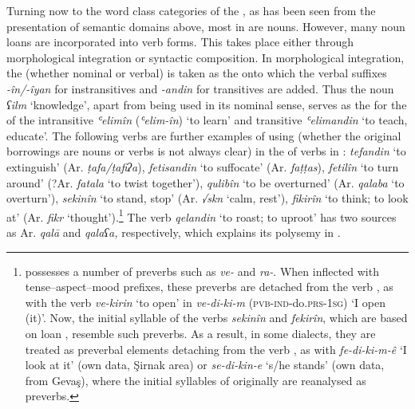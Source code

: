 \documentclass[output=paper]{langsci/langscibook}
\begin{document}
Turning now to the word class categories of the , as has been seen from the presentation of semantic domains above, most   in  are nouns. However, many  noun loans are incorporated into  verb forms. This takes place either through morphological integration or syntactic composition. In morphological integration, the   (whether nominal or verbal) is taken as the  onto which the  verbal suffixes \textit{-în/-îyan} for instransitives and \textit{{}-andin} for transitives are added. Thus the  noun \textit{ʕilm} ‘knowledge’, apart from being used in its nominal sense, serves as the  for the  of the intransitive \textit{ʿelimîn} (\textit{ʿelim-în}) ‘to learn’ and transitive \textit{ʿelimandin} ‘to teach, educate’. The following verbs are further examples of using   (whether the original borrowings are nouns or verbs is not always clear) in the  of verbs in : \textit{tefandin} ‘to extinguish’ (Ar. \textit{ṭafa/ṭafiʔa}), \textit{fetisandin} ‘to suffocate’ (Ar. \textit{faṭṭas}), \textit{fetilîn} ‘to turn around’ (?Ar. \textit{fatala} ‘to twist together’), \textit{qulibîn} ‘to be overturned’ (Ar. \textit{qalaba} ‘to overturn’), \textit{sekinîn} ‘to stand, stop’ (Ar. \textit{√skn} ‘calm, rest’), \textit{fikirîn} ‘to think; to look at’ (Ar. \textit{fikr} ‘thought’).\footnote{ possesses a number of preverbs such as \textit{ve-} and \textit{ra-}. When inflected with tense--aspect--mood prefixes, these preverbs are detached from the verb , as with the verb \textit{ve-kirin} ‘to open’ in \textit{ve-di-ki-m} (\textsc{pvb-ind}{}-do.\textsc{prs-1sg}) ‘I open (it)’. Now, the initial syllable of the verbs \textit{sekinîn} and \textit{fekirîn}, which are based on  loan , resemble such  preverbs. As a result, in some dialects, they are treated as preverbal elements detaching from the verb , as with \textit{fe-di-ki-m-ê} ‘I look at it’ (own data, Şirnak area) or \textit{se-di-kin-e} ‘s/he stands’ (own data, from Gevaş), where the initial syllables of originally   are reanalysed as preverbs.}  The verb \textit{qelandin} ‘to roast; to uproot’ has two sources as Ar. \textit{qalā} and \textit{qalaʕa,} respectively, which explains its polysemy in . 
\end{document}
